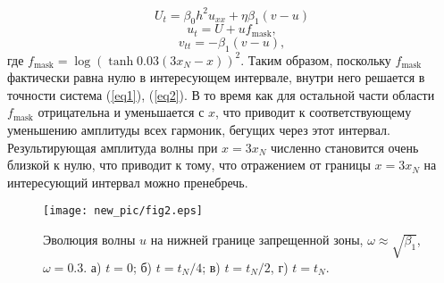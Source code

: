 $$
U_{t}=\beta_0 h^2 u_{xx}+\eta \beta_1 (v-u)
$$
$$
u_{t}=U + u f_{\text{mask}},
$$
$$
v_{tt}=-\beta_1 (v-u),
$$
где $ f_{\text {mask}} = \log \left(\tanh {0.03 (3 x_N - x)} \right) ^ 2 $. Таким образом, поскольку $ f_{\text{mask}} $ фактически равна нулю в интересующем интервале, внутри него решается в точности система (\ref{eq1}), (\ref{eq2}). В то время как для остальной части области $ f_{\text{mask}} $ отрицательна и уменьшается с $ x $, что приводит к соответствующему уменьшению амплитуды всех гармоник, бегущих через этот интервал. Результирующая амплитуда волны при $ x = 3 x_N $ численно становится очень близкой к нулю, что приводит к тому, что отражением от границы $ x = 3 x_N $ на интересующий интервал можно пренебречь.
\begin{figure*}
\begin{center}
\texttt{[image: new\_pic/fig2.eps]}
\caption{Эволюция волны $ u $ на нижней границе запрещенной зоны, $ \omega \approx \sqrt {\beta_1} $, $\omega = 0.3$. а) $ t = 0 $; б) $ t = t_N / 4 $; в) $ t = t_N / 2 $, г) $ t = t_N $.}
\label{fg2}
\end{center}
\end{figure*}

